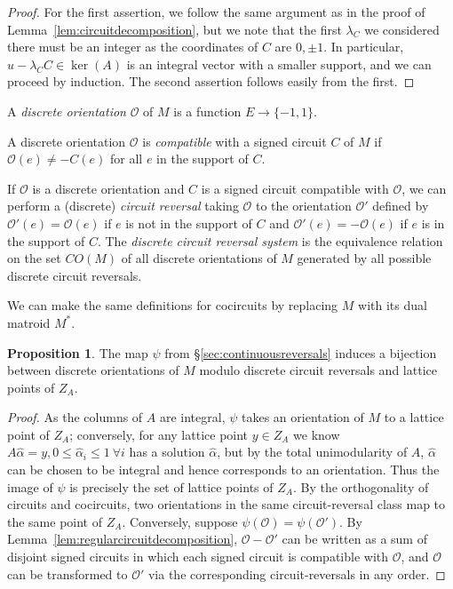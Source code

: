 \documentclass[12pt]{amsart}
\numberwithin{equation}{section}
\theoremstyle{definition}
\newtheorem{proposition}[theorem]{Proposition}
\begin{document}
\begin{proof} For the first assertion, we follow the same argument as in the proof of Lemma~\ref{lem:circuitdecomposition}, but we note that the first $\lambda_C$ we considered there must be an integer as the coordinates of $C$ are $0,\pm 1$.  In particular, $u-\lambda_C C\in\ker(A)$ is an integral vector with a smaller support, and we can proceed by induction. The second assertion follows easily from the first.
\end{proof}

A {\em discrete orientation} ${\mathcal O}$ of $M$ is a function $E \to \{-1,1\}$.

A discrete orientation ${\mathcal O}$ is {\em compatible} with a signed circuit $C$ of $M$ if ${\mathcal O}(e) \neq -C(e)$ for all $e$ in the support of $C$.

If $\mathcal{O}$ is a discrete orientation and $C$ is a signed circuit compatible with $\mathcal{O}$, we can perform a (discrete) {\em circuit reversal} taking $\mathcal{O}$ to the orientation $\mathcal{O}'$ defined by $\mathcal{O}'(e) = \mathcal{O}(e)$ if $e$ is not in the support of $C$ and $\mathcal{O}'(e) = -\mathcal{O}(e)$ if $e$ is in the support of $C$.
The {\em discrete circuit reversal system} is the equivalence relation on the set $CO(M)$ of all discrete orientations of $M$ generated by all possible discrete circuit reversals. 

We can make the same definitions for cocircuits by replacing $M$ with its dual matroid $M^*$.

\begin{proposition} \label{prop:latticepointprop}
The map $\psi$ from \S\ref{sec:continuousreversals} induces a bijection between discrete orientations of $M$ modulo discrete circuit reversals and lattice points of $Z_A$.
\end{proposition}

\begin{proof}
As the columns of $A$ are integral, $\psi$ takes an orientation of $M$ to a lattice point of $Z_A$; conversely, for any lattice point $y\in Z_A$ we know $A\hat{\alpha}=y, 0\leq \hat{\alpha}_i\leq 1\ \forall i$ has a solution $\hat{\alpha}$, but by the total unimodularity of $A$, $\hat{\alpha}$ can be chosen to be integral and hence corresponds to an orientation.  Thus the image of $\psi$ is precisely the set of lattice points of $Z_A$. By the orthogonality of circuits and cocircuits, two orientations in the same circuit-reversal class map to the same point of $Z_A$.  Conversely, suppose $\psi(\mathcal{O})=\psi(\mathcal{O}')$. 
By Lemma~\ref{lem:regularcircuitdecomposition},
$\mathcal{O}-\mathcal{O}'$ can be written as a sum of disjoint signed circuits in which each signed circuit is compatible with $\mathcal{O}$, and $\mathcal{O}$ can be transformed to $\mathcal{O}'$ via the corresponding circuit-reversals in any order.
\end{proof}
\end{document}
